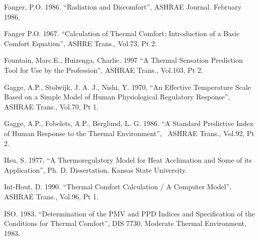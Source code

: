 Fanger, P.O. 1986. ``Radiation and Discomfort'', ASHRAE Journal. February 1986.

Fanger P.O. 1967. ``Calculation of Thermal Comfort: Introduction of a Basic Comfort Equation'', ASHRE Trans., Vol.73, Pt 2.

Fountain, Marc.E., Huizenga, Charlie. 1997 ``A Thermal Sensation Prediction Tool for Use by the Profession'', ASHRAE Trans., Vol.103, Pt 2.

Gagge, A.P., Stolwijk, J. A. J., Nishi, Y. 1970. ``An Effective Temperature Scale Based on a Simple Model of Human Physiological Regulatory Response'', ASHRAE Trans., Vol.70, Pt 1.

Gagge, A.P., Fobelets, A.P., Berglund, L. G. 1986. ``A Standard Predictive Index of Human Response to the Thermal Environment'',~ ASHRAE Trans., Vol.92, Pt 2.

Hsu, S. 1977. ``A Thermoregulatory Model for Heat Acclimation and Some of its Application'', Ph. D. Dissertation, Kansas State University.

Int-Hout, D. 1990. ``Thermal Comfort Calculation / A Computer Model'', ASHRAE Trans., Vol.96, Pt 1.

ISO. 1983. ``Determination of the PMV and PPD Indices and Specification of the Conditions for Thermal Comfort'', DIS 7730, Moderate Thermal Environment, 1983.
